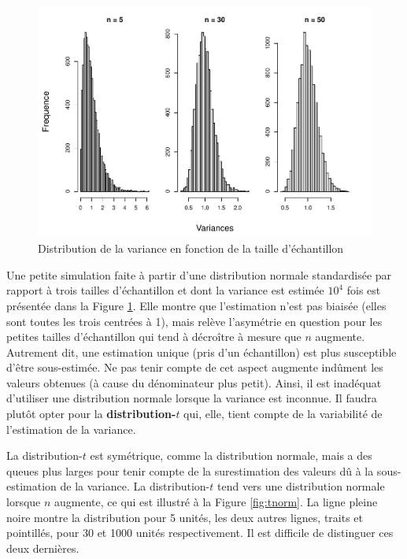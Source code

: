\documentclass[
]{book}
\begin{document}
\begin{figure}
\centering
\includegraphics{08-Inferer_files/figure-latex/illvar-1.pdf}
\caption{\label{fig:illvar}Distribution de la variance en fonction de la taille d'échantillon}
\end{figure}

Une petite simulation faite à partir d'une distribution normale standardisée par rapport à trois tailles d'échantillon et dont la variance est estimée \ensuremath{10^{4}} fois est présentée dans la Figure \ref{fig:illvar}. Elle montre que l'estimation n'est pas biaisée (elles sont toutes les trois centrées à 1), mais relève l'asymétrie en question pour les petites tailles d'échantillon qui tend à décroître à mesure que \(n\) augmente. Autrement dit, une estimation unique (pris d'un échantillon) est plus susceptible d'être sous-estimée. Ne pas tenir compte de cet aspect augmente indûment les valeurs obtenues (à cause du dénominateur plus petit). Ainsi, il est inadéquat d'utiliser une distribution normale lorsque la variance est inconnue. Il faudra plutôt opter pour la \textbf{distribution-\(t\)} qui, elle, tient compte de la variabilité de l'estimation de la variance.

La distribution-\(t\) est symétrique, comme la distribution normale, mais a des queues plus larges pour tenir compte de la surestimation des valeurs dû à la sous-estimation de la variance. La distribution-\(t\) tend vers une distribution normale lorsque \(n\) augmente, ce qui est illustré à la Figure \ref{fig:tnorm}. La ligne pleine noire montre la distribution pour 5 unités, les deux autres lignes, traits et pointillés, pour 30 et 1000 unités respectivement. Il est difficile de distinguer ces deux dernières.
\end{document}
